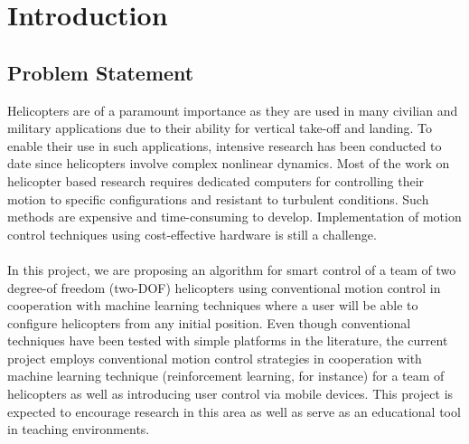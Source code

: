 \chapter{Introduction}
\label{ch: Chapter1}

\section{Problem Statement}
Helicopters are of a paramount importance as
they are used in many civilian and military applications due to their ability for vertical take-off and landing. To enable their use in such applications, intensive research has been conducted to date since helicopters involve complex nonlinear dynamics. Most of the work on helicopter based research requires dedicated computers for controlling their motion to specific configurations and resistant to turbulent conditions. Such methods are expensive and time-consuming to develop. Implementation of motion control techniques using cost-effective hardware is still a challenge.\\ 
\\
In this project, we are proposing an algorithm for smart control of a team of two degree-of freedom (two-DOF) helicopters using conventional motion control in cooperation with machine learning techniques where a user will be able to configure helicopters from any initial position. Even though conventional techniques have been tested with simple platforms in the literature, the current project employs conventional motion control strategies in cooperation with machine learning technique (reinforcement learning, for instance) for a team of helicopters as well as introducing user control via mobile devices. This project is expected to encourage research in this area as well as serve as an educational tool in teaching environments.


